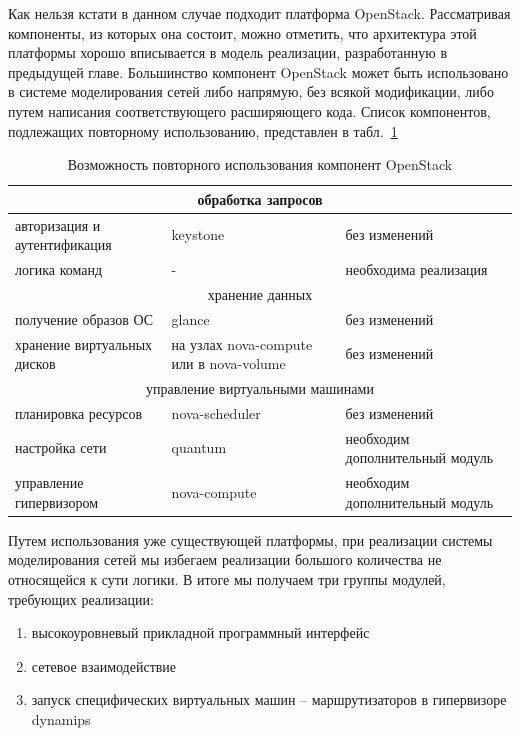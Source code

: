 Как нельзя кстати в данном случае подходит платформа OpenStack. Рассматривая компоненты,
из которых она состоит, можно отметить, что архитектура этой платформы хорошо вписывается
в модель реализации, разработанную в предыдущей главе.
Большинство компонент OpenStack может быть использовано в 
системе моделирования сетей либо напрямую, без всякой модификации, либо путем
написания соответствующего расширяющего кода. Список компонентов, подлежащих
повторному использованию, представлен в табл.~\ref{tab:openstack-reuse}
\begin{table}
\center
\caption{Возможность повторного использования компонент OpenStack}
\label{tab:openstack-reuse}
\begin{tabular}{|p{5cm}|p{4cm}|p{5cm}|} \hline 
\multicolumn{3}{|c|}{обработка запросов} \\ \hline 
авторизация и аутентификация & keystone & без изменений\\ \hline
логика команд & - & необходима реализация \\ \hline
\multicolumn{3}{|c|}{хранение данных} \\ \hline
получение образов ОС & glance & без изменений \\ \hline
хранение виртуальных дисков & на узлах nova-compute или в nova-volume & без изменений\\ \hline
\multicolumn{3}{|c|}{управление виртуальными машинами} \\ \hline
планировка ресурсов & nova-scheduler & без изменений \\ \hline
настройка сети & quantum & необходим дополнительный модуль \\ \hline
управление гипервизором & nova-compute & необходим дополнительный модуль \\ \hline
\hline 
\end{tabular} 
\end{table}

Путем использования уже существующей платформы, при реализации системы моделирования
сетей мы избегаем реализации большого количества не относящейся к сути логики. В итоге мы
получаем три группы модулей, требующих реализации:
\begin{enumerate}
    \item высокоуровневый прикладной программный интерфейс
    \item сетевое взаимодействие
    \item запуск специфических виртуальных машин -- маршрутизаторов в гипервизоре dynamips
\end{enumerate}

